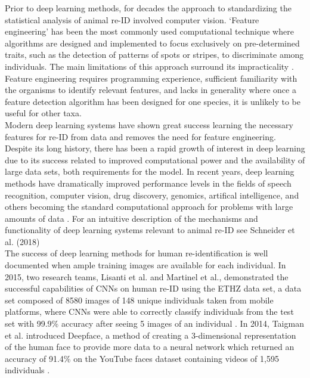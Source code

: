 \documentclass[11pt]{article}
\begin{document}
Prior to deep learning methods, for decades the approach to standardizing the statistical analysis of animal re-ID involved computer vision. `Feature engineering' has been the most commonly used computational technique where algorithms are designed and implemented to focus exclusively on pre-determined traits, such as the detection of patterns of spots or stripes, to discriminate among individuals. The main limitations of this approach surround its impracticality \cite{hiby2009tiger}. Feature engineering requires programming experience, sufficient familiarity with the organisms to identify relevant features, and lacks in generality where once a feature detection algorithm has been designed for one species, it is unlikely to be useful for other taxa. 
\newline
\\
Modern deep learning systems have shown great success learning the necessary features for re-ID from data and removes the need for feature engineering. Despite its long history, there has been a rapid growth of interest in deep learning due to its success related to improved computational power and the availability of large data sets, both requirements for the model. In recent years, deep learning methods have dramatically improved performance levels in the fields of speech recognition, computer vision, drug discovery, genomics, artifical intelligence, and others becoming the standard computational approach for problems with large amounts of data \cite{lecun2015deep}. For an intuitive description of the mechanisms and functionality of deep learning systems relevant to animal re-ID see Schneider et al. (2018) \cite{schneider2018deep}
\newline
\\
The success of deep learning methods for human re-identification is well documented when ample training images are available for each individual. In 2015, two research teams, Lisanti et al. and Martinel et al., demonstrated the successful capabilities of CNNs on human re-ID using the ETHZ data set, a data set composed of 8580 images of 148 unique individuals taken from mobile platforms, where CNNs were able to correctly classify individuals from the test set with 99.9\% accuracy after seeing 5 images of an individual \cite{lisanti2015person, martinel2015re}. In 2014, Taigman et al. introduced Deepface, a method of creating a 3-dimensional representation of the human face to provide more data to a neural network which returned an accuracy of 91.4\% on the YouTube faces dataset containing videos of 1,595 individuals \cite{taigman2014deepface}. 
\end{document}
